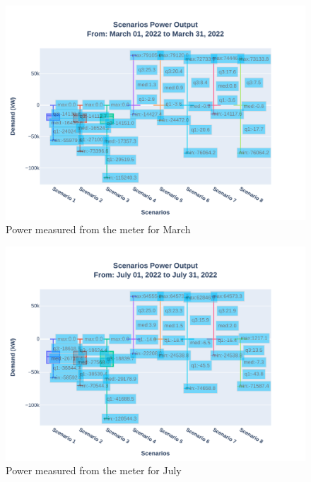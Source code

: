 \documentclass[conference, usletter]{IEEEtran}
\begin{document}
\begin{figure}
\centering
\includegraphics[width=1\linewidth]{Fig/Option_3/0_Scn_Output_Run_3_Mar_01_2022_to_Mar_31_2022}
\caption{\footnotesize  Power measured from the meter for March}
\label{fig:0scnoutputrun2mar012022tomar312022}
\end{figure}
\begin{figure}
\centering
\includegraphics[width=1\linewidth]{Fig/Option_3/4_Scn_Output_Run_3_Jul_01_2022_to_Jul_31_2022}
\caption{\footnotesize  Power measured from the meter for July}
\label{fig:4scnoutputrun2jul012022tojul312022}
\end{figure}
\end{document}
